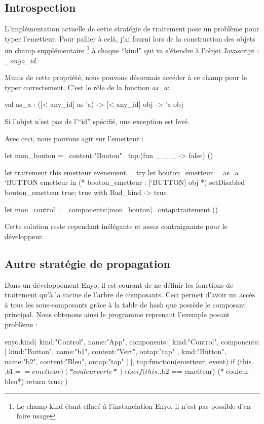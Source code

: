 \documentclass[11pt,a4paper]{report}
\begin{document}
\subsection{Introspection}

L'implémentation actuelle de cette stratégie de traitement pose un problème pour typer l'emetteur.
Pour pallier à celà, j'ai fourni lors de la construction des objets un champ supplémentaire
\footnote{Le champ kind étant effacé à l'instanciation Enyo, il n'est pas possible d'en faire usage} à chaque
``kind'' qui va s'étendre à l'objet Javascript : \emph{\_onyo\_id}.

Munis de cette propriété, nous pouvons désormais accéder à ce champ pour le typer correctement.
C'est le rôle de la fonction \emph{as\_a}:

\begin{OCaml}
  val as_a : ([< any_id] as 'a) -> [< any_id] obj -> 'a obj
\end{OCaml}

Si l'objet n'est pas de l'``id'' spécifié, une exception est levé.

Avec ceci, nous pouvons agir sur l'emetteur :
\begin{OCaml}
  let mon_bouton = ~content:"Bouton" ~tap:(fun _ _ _ -> false) ()

  let traitement this emetteur evenement =
     try 
         let bouton_emetteur = as_a `BUTTON emetteur in
         (* bouton_emetteur : [`BUTTON] obj *)
         setDisabled bouton_emetteur true;
         true
     with Bad_kind -> true

  let mon_control = ~components:[mon_bouton] ~ontap:traitement ()
\end{OCaml}

Cette solution reste cependant inélégante et assez contraignante pour le développeur.

\subsection{Autre stratégie de propagation}\label{sub:event_amel}

Dans un développement Enyo, il est courant de ne définir les fonctions de traitement qu'à la racine de l'arbre
de composants. Ceci permet d'avoir un accès à tous les sous-composants grâce à la table de hash que possède
le composant principal. Nous obtenons ainsi le programme reprenant l'exemple posant problème :
\begin{JavaScript}
  enyo.kind({
    kind:"Control",
    name:"App",
    components:[
      {
        kind:"Control",
        components:[
          {kind:"Button", name:"b1", content:"Vert",
            ontap:"tap"
          },
          {kind:"Button", name:"b2", content:"Bleu",         
            ontap:"tap"
          }
        ]
      }
    ],
    tap:function(emetteur, event){
      if (this.$.b1 == emetteur){
        (* couleur verte *)
      } else if (this.$.b2 == emetteur){
        (* couleur bleu*)
      }
      return true;
    }
})
\end{JavaScript}
\end{document}
